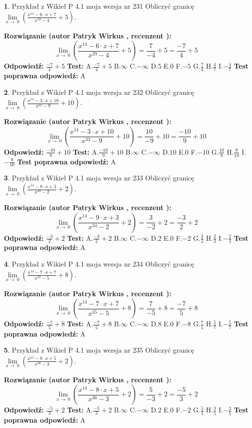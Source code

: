 \documentclass[12pt, a4paper]{article}
\theoremstyle{definition} %
\newtheorem{zad}{}
\newcommand{\zadStart}[1]{\begin{zad}#1\newline}
\newcommand{\zadStop}{\end{zad}}
\newcommand{\rozwStart}[2]{\noindent \textbf{Rozwiązanie (autor #1 , recenzent #2): }\newline}
\newcommand{\rozwStop}{\newline}
\newcommand{\odpStart}{\noindent \textbf{Odpowiedź:}\newline}
\newcommand{\odpStop}{\newline}
\newcommand{\testStart}{\noindent \textbf{Test:}\newline}
\newcommand{\testStop}{\newline}
\newcommand{\kluczStart}{\noindent \textbf{Test poprawna odpowiedź:}\newline}
\newcommand{\kluczStop}{\newline}
\begin{document}
\zadStart{Przykład z Wikieł P 4.1 moja wersja nr 231}
Obliczyć granicę $\lim\limits_{x\to\ 0}(\frac{x^{14}-6 \cdot x +7}{x^{29}-4}+5)$.
\zadStop
\rozwStart{Patryk Wirkus}{}
$$\lim\limits_{x\to\ 0}(\frac{x^{14}-6 \cdot x +7}{x^{29}-4}+5)=\frac{7}{-4}+5=\frac{-7}{4}+5$$
\rozwStop
\odpStart
$\frac{-7}{4}+5$
\odpStop
\testStart
A.$\frac{-7}{4}+5$
B.$\infty$
C.$-\infty$
D.$5$
E.$0$
F.$-5$
G.$\frac{7}{4}$
H.$\frac{4}{7}$
I.$-\frac{4}{7}$
\testStop
\kluczStart
A
\kluczStop



\zadStart{Przykład z Wikieł P 4.1 moja wersja nr 232}
Obliczyć granicę $\lim\limits_{x\to\ 0}(\frac{x^{14}-3 \cdot x +10}{x^{33}-9}+10)$.
\zadStop
\rozwStart{Patryk Wirkus}{}
$$\lim\limits_{x\to\ 0}(\frac{x^{14}-3 \cdot x +10}{x^{33}-9}+10)=\frac{10}{-9}+10=\frac{-10}{9}+10$$
\rozwStop
\odpStart
$\frac{-10}{9}+10$
\odpStop
\testStart
A.$\frac{-10}{9}+10$
B.$\infty$
C.$-\infty$
D.$10$
E.$0$
F.$-10$
G.$\frac{10}{9}$
H.$\frac{9}{10}$
I.$-\frac{9}{10}$
\testStop
\kluczStart
A
\kluczStop



\zadStart{Przykład z Wikieł P 4.1 moja wersja nr 233}
Obliczyć granicę $\lim\limits_{x\to\ 0}(\frac{x^{14}-9 \cdot x +3}{x^{34}-2}+2)$.
\zadStop
\rozwStart{Patryk Wirkus}{}
$$\lim\limits_{x\to\ 0}(\frac{x^{14}-9 \cdot x +3}{x^{34}-2}+2)=\frac{3}{-2}+2=\frac{-3}{2}+2$$
\rozwStop
\odpStart
$\frac{-3}{2}+2$
\odpStop
\testStart
A.$\frac{-3}{2}+2$
B.$\infty$
C.$-\infty$
D.$2$
E.$0$
F.$-2$
G.$\frac{3}{2}$
H.$\frac{2}{3}$
I.$-\frac{2}{3}$
\testStop
\kluczStart
A
\kluczStop



\zadStart{Przykład z Wikieł P 4.1 moja wersja nr 234}
Obliczyć granicę $\lim\limits_{x\to\ 0}(\frac{x^{14}-7 \cdot x +7}{x^{35}-5}+8)$.
\zadStop
\rozwStart{Patryk Wirkus}{}
$$\lim\limits_{x\to\ 0}(\frac{x^{14}-7 \cdot x +7}{x^{35}-5}+8)=\frac{7}{-5}+8=\frac{-7}{5}+8$$
\rozwStop
\odpStart
$\frac{-7}{5}+8$
\odpStop
\testStart
A.$\frac{-7}{5}+8$
B.$\infty$
C.$-\infty$
D.$8$
E.$0$
F.$-8$
G.$\frac{7}{5}$
H.$\frac{5}{7}$
I.$-\frac{5}{7}$
\testStop
\kluczStart
A
\kluczStop



\zadStart{Przykład z Wikieł P 4.1 moja wersja nr 235}
Obliczyć granicę $\lim\limits_{x\to\ 0}(\frac{x^{14}-8 \cdot x +5}{x^{36}-3}+2)$.
\zadStop
\rozwStart{Patryk Wirkus}{}
$$\lim\limits_{x\to\ 0}(\frac{x^{14}-8 \cdot x +5}{x^{36}-3}+2)=\frac{5}{-3}+2=\frac{-5}{3}+2$$
\rozwStop
\odpStart
$\frac{-5}{3}+2$
\odpStop
\testStart
A.$\frac{-5}{3}+2$
B.$\infty$
C.$-\infty$
D.$2$
E.$0$
F.$-2$
G.$\frac{5}{3}$
H.$\frac{3}{5}$
I.$-\frac{3}{5}$
\testStop
\kluczStart
A
\kluczStop
\end{document}
